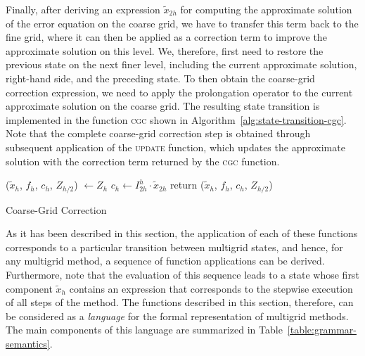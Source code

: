 Finally, after deriving an expression $\tilde{x}_{2h}$ for computing the approximate solution of the error equation on the coarse grid, we have to transfer this term back to the fine grid, where it can then be applied as a correction term to improve the approximate solution on this level.
We, therefore, first need to restore the previous state on the next finer level, including the current approximate solution, right-hand side, and the preceding state.
To then obtain the coarse-grid correction expression, we need to apply the prolongation operator to the current approximate solution on the coarse grid.
The resulting state transition is implemented in the function \textsc{cgc} shown in Algorithm~\ref{alg:state-transition-cgc}.
Note that the complete coarse-grid correction step is obtained through subsequent application of the \textsc{update} function, which updates the approximate solution with the correction term returned by the \textsc{cgc} function.
\begin{algorithm}
	\begin{algorithmic}
		\State ($\tilde{x}_h$, $f_{h}$, $c_h$, $Z_{h/2}$) $\gets Z_{h}$
		\State $c_h \gets I_{2h}^{h} \cdot \tilde{x}_{2h}$
		\State return ($\tilde{x}_h$, $f_{h}$, $c_h$, $Z_{h/2}$)
		\EndFunction
	\end{algorithmic}
\caption{Coarse-Grid Correction}
 \label{alg:state-transition-cgc}
\end{algorithm}
As it has been described in this section, the application of each of these functions corresponds to a particular transition between multigrid states, and hence, for any multigrid method, a sequence of function applications can be derived.
Furthermore, note that the evaluation of this sequence leads to a state whose first component $\tilde{x}_h$ contains an expression that corresponds to the stepwise execution of all steps of the method.
The functions described in this section, therefore, can be considered as a \emph{language} for the formal representation of multigrid methods. 
The main components of this language are summarized in Table~\ref{table:grammar-semantics}.
